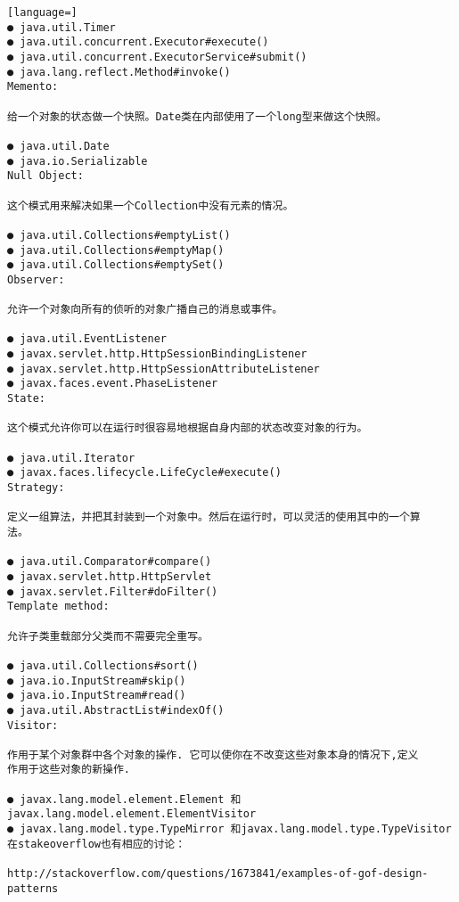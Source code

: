 \documentclass[a4paper,11pt]{book}
\begin{document}
\begin{lstlisting}[language=]
● java.util.Timer
● java.util.concurrent.Executor#execute()
● java.util.concurrent.ExecutorService#submit()
● java.lang.reflect.Method#invoke()
Memento:

给一个对象的状态做一个快照。Date类在内部使用了一个long型来做这个快照。

● java.util.Date
● java.io.Serializable
Null Object:

这个模式用来解决如果一个Collection中没有元素的情况。

● java.util.Collections#emptyList()
● java.util.Collections#emptyMap()
● java.util.Collections#emptySet()
Observer:

允许一个对象向所有的侦听的对象广播自己的消息或事件。

● java.util.EventListener
● javax.servlet.http.HttpSessionBindingListener
● javax.servlet.http.HttpSessionAttributeListener
● javax.faces.event.PhaseListener
State:

这个模式允许你可以在运行时很容易地根据自身内部的状态改变对象的行为。

● java.util.Iterator
● javax.faces.lifecycle.LifeCycle#execute()
Strategy:

定义一组算法，并把其封装到一个对象中。然后在运行时，可以灵活的使用其中的一个算
法。

● java.util.Comparator#compare()
● javax.servlet.http.HttpServlet
● javax.servlet.Filter#doFilter()
Template method:

允许子类重载部分父类而不需要完全重写。

● java.util.Collections#sort()
● java.io.InputStream#skip()
● java.io.InputStream#read()
● java.util.AbstractList#indexOf()
Visitor:

作用于某个对象群中各个对象的操作. 它可以使你在不改变这些对象本身的情况下,定义
作用于这些对象的新操作.

● javax.lang.model.element.Element 和javax.lang.model.element.ElementVisitor
● javax.lang.model.type.TypeMirror 和javax.lang.model.type.TypeVisitor
在stakeoverflow也有相应的讨论：

http://stackoverflow.com/questions/1673841/examples-of-gof-design-patterns
\end{lstlisting}
\end{document}
